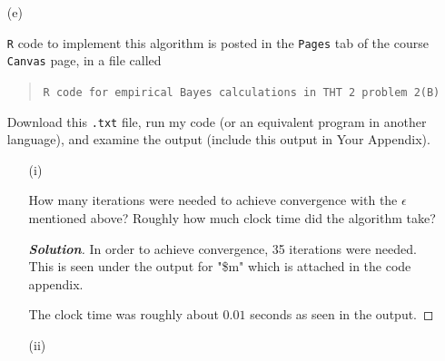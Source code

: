 \documentclass[12pt]{article}
\newenvironment{solution}{\begin{tcolorbox}[breakable]\begin{proof}[\textbf{\textit{Solution}}] }{\end{proof}\end{tcolorbox}}
\begin{document}
\begin{itemize}


\item[(e)]

\textit{} \vspace*{0.025in} \texttt{R} code to implement this algorithm is posted in the \texttt{Pages} tab of the course \texttt{Canvas} page, in a file called

\begin{quote}

\texttt{R code for empirical Bayes calculations in THT 2 problem 2(B)}

\end{quote}

Download this \texttt{.txt} file, run my code (or an equivalent program in another language), and examine the output (include this output in Your Appendix). 

\begin{itemize}
\item[(i)]

How many iterations were needed to achieve convergence with the $\epsilon$ mentioned above? Roughly how much clock time did the algorithm take? \textit{\fbox{\textbf{[5 points]}}}

\begin{solution}
    In order to achieve convergence, 35 iterations were needed. This is seen under the output for "\$m" which is attached in the code appendix. 

    The clock time was roughly about $0.01$ seconds as seen in the output. 
\end{solution}


\item[(ii)]


\end{itemize}
\end{itemize}
\end{document}
